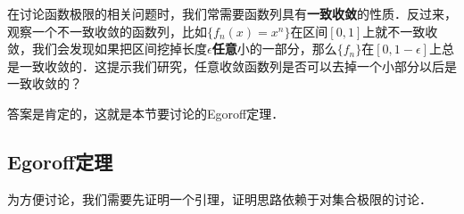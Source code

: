 
在讨论函数极限的相关问题时，我们常需要函数列具有\textbf{一致收敛}的性质．反过来，观察一个不一致收敛的函数列，比如$\{f_n(x)=x^n\}$在区间$[0, 1]$上就不一致收敛，我们会发现如果把区间挖掉长度$\epsilon$\textbf{任意}小的一部分，那么$\{f_n\}$在$[0, 1-\epsilon]$上总是一致收敛的．这提示我们研究，任意收敛函数列是否可以去掉一个小部分以后是一致收敛的？

答案是肯定的，这就是本节要讨论的Egoroff定理．

\subsection{Egoroff定理}

为方便讨论，我们需要先证明一个引理，证明思路依赖于对集合极限的讨论．










